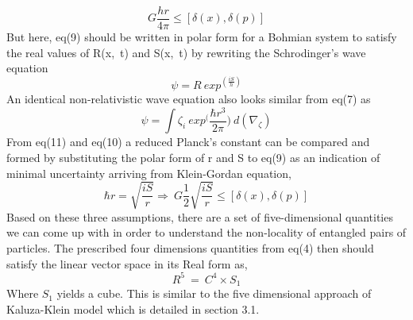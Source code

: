 \documentclass{article}
\begin{document}
\begin{equation}
   G \frac{h  r}{4 \pi } \leq  [\delta(x), \delta (p)]
\end{equation}
But here, eq(9) should be written in polar form for a Bohmian system to satisfy the real values of R(x,\ t) and S(x,\ t) by rewriting the Schrodinger's wave equation 
\begin{equation}
 {\psi = R\ exp^({\frac{i S}{h}})}
\end{equation}
An identical non-relativistic wave equation also looks similar from eq(7) as 
\begin{equation}
 {\psi = \int \zeta_{i}\ exp^(\frac{\hbar r^{3}}{2\pi}}) \ d(\nabla_\zeta)
\end{equation}
From eq(11) and eq(10) a reduced Planck's constant can be compared and formed by substituting the polar form of r and S to eq(9) as an indication of minimal uncertainty arriving from Klein-Gordan equation, 
\begin{equation}
 \hbar r  = \sqrt{\frac{iS}{r}} 
 \Rightarrow \ G \frac{1}{2} \sqrt{\frac{iS}{r}} \leq  [\delta(x), \delta (p)] 
\end{equation}
Based on these three assumptions, there are a set of five-dimensional quantities we can come up with in order to understand the non-locality of entangled pairs of particles. The prescribed four dimensions quantities from eq(4) then should satisfy the linear vector space in its Real form as,
\begin{equation}
     R^5 \ = \ C^4 \times S_1 
\end{equation} Where $S_1$ yields a cube. This is similar to the five dimensional approach of Kaluza-Klein model which is detailed in section 3.1.
\end{document}
